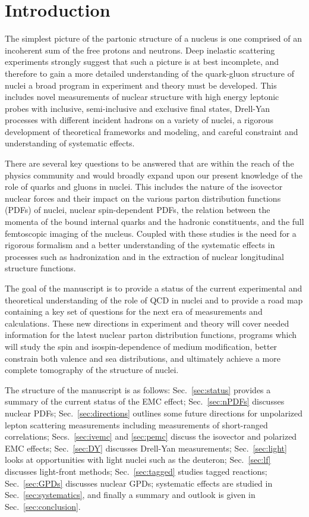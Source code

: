 \section{Introduction}

The simplest picture of the partonic structure of a nucleus is one comprised of an incoherent sum of the free protons and neutrons. Deep inelastic scattering experiments strongly suggest that such a picture is at best incomplete, and therefore to gain a more detailed understanding of the quark-gluon structure of nuclei a broad program in experiment and theory must be developed.  This includes novel measurements of nuclear structure with high energy leptonic probes with inclusive, semi-inclusive and exclusive final states, Drell-Yan processes with different incident hadrons on a variety of nuclei, a rigorous development of theoretical frameworks and modeling, and careful constraint and understanding of systematic effects.

There are several key questions to be answered that are within the reach of the physics community and would broadly expand upon our present knowledge of the role of quarks and gluons in nuclei.  This includes the nature of the isovector nuclear forces and their impact on the various parton distribution functions (PDFs) of nuclei, nuclear spin-dependent PDFs, the relation between the momenta of the bound internal quarks and the hadronic constituents, and the full femtoscopic imaging of the nucleus.  Coupled with these studies is the need for a rigorous formalism and a better understanding of the systematic effects in processes such as hadronization and in the extraction of nuclear longitudinal structure functions. 

The goal of the manuscript is to provide a status of the current experimental and theoretical understanding of the role of QCD in nuclei and to provide a road map containing a key set of questions for the next era of measurements and calculations. These new directions in experiment and theory will cover needed information for the latest nuclear parton distribution functions, programs which will study the spin and isospin-dependence of medium modification, better constrain both valence and sea distributions, and ultimately achieve a more complete tomography of the structure of nuclei. 

The structure of the manuscript is as follows: Sec.~\ref{sec:status} provides a summary of the current status of the EMC effect; Sec.~\ref{sec:nPDFs} discusses nuclear PDFs; Sec.~\ref{sec:directions} outlines some future directions for unpolarized lepton scattering measurements including measurements of short-ranged correlations; Secs.~\ref{sec:ivemc} and \ref{sec:pemc} discuss the isovector and polarized EMC effects; Sec.~\ref{sec:DY} discusses Drell-Yan measurements; Sec.~\ref{sec:light} looks at opportunities with light nuclei such as the deuteron; Sec.~\ref{sec:lf} discusses light-front methods; Sec.~\ref{sec:tagged} studies tagged reactions; Sec.~\ref{sec:GPDs} discusses nuclear GPDs; systematic effects are studied in Sec.~\ref{sec:systematics}, and finally a summary and outlook is given in Sec.~\ref{sec:conclusion}.
